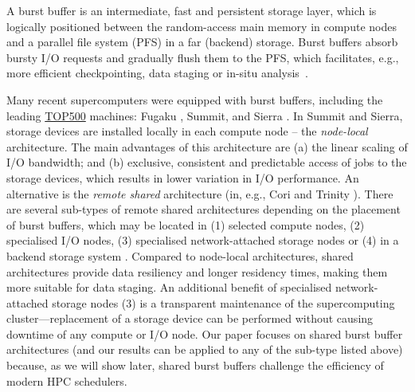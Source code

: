 \documentclass[runningheads]{llncs}
\begin{document}
A burst buffer is an intermediate, fast and persistent storage layer, which is logically positioned between the random-access main memory in compute nodes and a parallel file system (PFS) in a far (backend) storage. Burst buffers absorb bursty I/O requests and gradually flush them to the PFS, which facilitates, e.g., more efficient checkpointing, data staging or in-situ analysis~\cite{osti_1328312}.

Many recent supercomputers were equipped with burst buffers, including the leading \href{https://www.top500.org/lists/top500/2020/11/}{TOP500} machines:
Fugaku \cite{fugaku}, Summit, and Sierra \cite{10.1109/SC.2018.00055}. In Summit and Sierra, storage devices are installed locally in each compute node -- the \emph{node-local} architecture. The main advantages of this architecture are (a) the linear scaling of I/O bandwidth; and (b) exclusive, consistent and predictable access of jobs to the storage devices, which results in lower variation in I/O performance. An alternative is the \emph{remote shared} architecture (in, e.g., Cori \cite{osti_1393591} and Trinity \cite{osti_1367056}). There are several sub-types of remote shared architectures depending on the placement of burst buffers, which may be located in (1) selected compute nodes, (2) specialised I/O nodes, (3) specialised network-attached storage nodes or (4) in a backend storage system \cite{osti_1328312}. Compared to node-local architectures, shared architectures provide data resiliency and longer residency times, making them more suitable for data staging. An additional benefit of specialised network-attached storage nodes (3) is a transparent maintenance of the supercomputing cluster---replacement of a storage device can be performed without causing downtime of any compute or I/O node. Our paper focuses on shared burst buffer architectures (and our results can be applied to any of the sub-type listed above) because, as we will show later, shared burst buffers challenge the efficiency of modern HPC schedulers.
\end{document}
